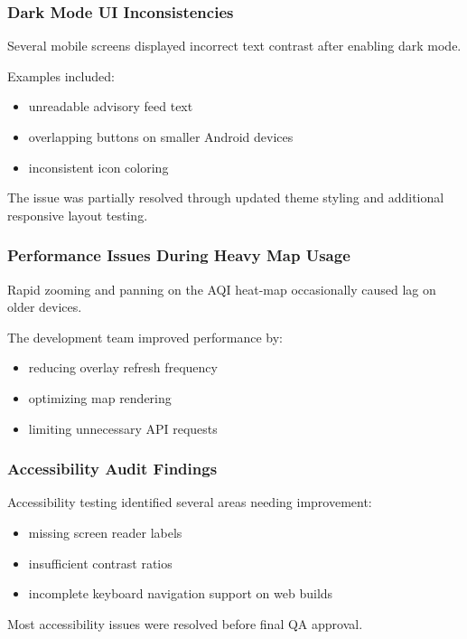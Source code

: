 \subsubsection{Dark Mode UI Inconsistencies}

Several mobile screens displayed incorrect text contrast after enabling dark mode.

Examples included:
\begin{itemize}
    \item unreadable advisory feed text
    \item overlapping buttons on smaller Android devices
    \item inconsistent icon coloring
\end{itemize}

The issue was partially resolved through updated theme styling and additional responsive layout testing.

\subsubsection{Performance Issues During Heavy Map Usage}

Rapid zooming and panning on the AQI heat-map occasionally caused lag on older devices.

The development team improved performance by:
\begin{itemize}
    \item reducing overlay refresh frequency
    \item optimizing map rendering
    \item limiting unnecessary API requests
\end{itemize}

\subsubsection{Accessibility Audit Findings}

Accessibility testing identified several areas needing improvement:
\begin{itemize}
    \item missing screen reader labels
    \item insufficient contrast ratios
    \item incomplete keyboard navigation support on web builds
\end{itemize}

Most accessibility issues were resolved before final QA approval.


